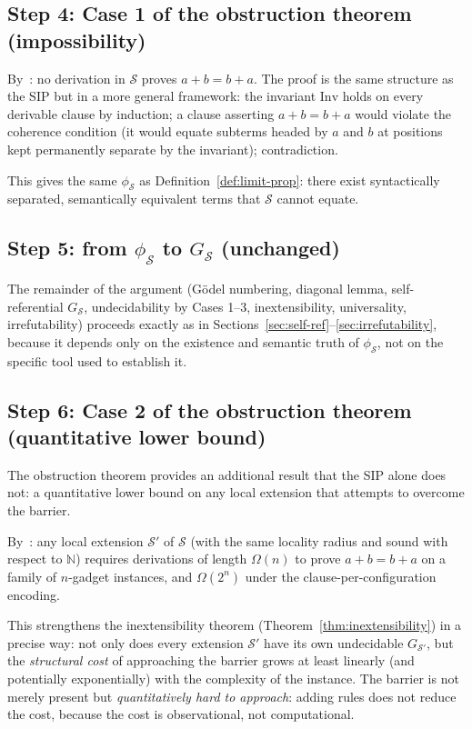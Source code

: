 \documentclass[11pt]{article}
\begin{document}
\subsection{Step 4: Case 1 of the obstruction theorem (impossibility)}

By~\cite[Theorem~4.1, Case~1]{buono2026obstruction}: no derivation in
$\mathcal{S}$ proves $a + b = b + a$. The proof is the same structure as
the SIP but in a more general framework: the invariant $\mathrm{Inv}$
holds on every derivable clause by induction; a clause asserting
$a + b = b + a$ would violate the coherence condition (it would equate
subterms headed by $a$ and $b$ at positions kept permanently separate by
the invariant); contradiction.

This gives the same $\phi_{\mathcal{S}}$ as
Definition~\ref{def:limit-prop}: there exist syntactically separated,
semantically equivalent terms that $\mathcal{S}$ cannot equate.

\subsection{Step 5: from $\phi_{\mathcal{S}}$ to $G_{\mathcal{S}}$
(unchanged)}

The remainder of the argument (G\"odel numbering, diagonal lemma,
self-referential $G_{\mathcal{S}}$, undecidability by Cases 1--3,
inextensibility, universality, irrefutability) proceeds exactly as in
Sections~\ref{sec:self-ref}--\ref{sec:irrefutability}, because it
depends only on the existence and semantic truth of $\phi_{\mathcal{S}}$,
not on the specific tool used to establish it.

\subsection{Step 6: Case 2 of the obstruction theorem (quantitative
lower bound)}

The obstruction theorem provides an additional result that the SIP alone
does not: a quantitative lower bound on any local extension that
attempts to overcome the barrier.

By~\cite[Theorem~4.1, Case~2]{buono2026obstruction}: any local extension
$\mathcal{S}'$ of $\mathcal{S}$ (with the same locality radius and sound
with respect to $\mathbb{N}$) requires derivations of length
$\Omega(n)$ to prove $a + b = b + a$ on a family of $n$-gadget
instances, and $\Omega(2^n)$ under the clause-per-configuration
encoding.

This strengthens the inextensibility theorem
(Theorem~\ref{thm:inextensibility}) in a precise way: not only does
every extension $\mathcal{S}'$ have its own undecidable
$G_{\mathcal{S}'}$, but the \emph{structural cost} of approaching the
barrier grows at least linearly (and potentially exponentially) with the
complexity of the instance. The barrier is not merely present but
\emph{quantitatively hard to approach}: adding rules does not reduce the
cost, because the cost is observational, not computational.
\end{document}
